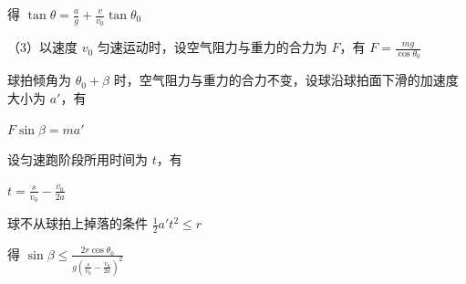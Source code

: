 \documentclass[\gkver]{gaokaozhenti}
\begin{document}
\begin{enumerate}
{得 $\tan\theta=\frac{a}{g}+\frac{v}{v_{0}}\tan\theta_{0}$

（3）以速度 $v_{0}$ 匀速运动时，设空气阻力与重力的合力为 $F$，有 $F=\frac{mg}{\cos\theta_{0}}$

球拍倾角为 $\theta_{0}+\beta$ 时，空气阻力与重力的合力不变，设球沿球拍面下滑的加速度大小为 $a'$，有

$F\sin \beta=ma'$

设匀速跑阶段所用时间为 $t$，有

$t=\frac{s}{v_{0}}-\frac{v_{0}}{2a}$

球不从球拍上掉落的条件 $\frac{1}{2}a't^{2}\leq r$

得 $\sin \beta \leq \frac{2r\cos \theta_{0}}{g\left(\frac{s}{v_{0}}-\frac{v_{0}}{2a}\right)^{2}}$
}

\end{enumerate}
\end{document}
